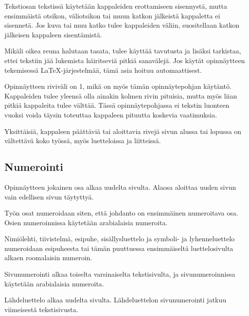 \documentclass[english,12pt,a4paper,pdftex,sci,utf8]{aaltothesis}
\begin{document}
Tekstiosan tekstiss\"a k\"aytet\"a\"an kappaleiden erottamiseen sisennyst\"a,
mutta ensimm\"aist\"a otsikon, v\"aliotsikon tai muun katkon j\"alkeist\"a
kappaletta ei sisennet\"a. Jos kuva tai muu katko tulee kappaleiden
v\"aliin, suositellaan katkon j\"alkeisen kappaleen sisent\"amist\"a.

Mik\"ali oikea reuna halutaan tasata, tulee k\"aytt\"a\"a tavutusta ja lis\"aksi
tarkistaa, ettei tekstiin j\"a\"a lukemista h\"airitsevi\"a pitki\"a sanav\"alej\"a. Jos
k\"ayt\"at opinn\"aytteen tekemisess\"a \LaTeX-j\"arjestelm\"a\"a,
t\"am\"a asia hoituu automaattisest.

Opinn\"aytteen riviv\"ali on 1, mik\"a on my\"os t\"am\"an opinn\"aytepohjan k\"ayt\"ant\"o.
Kappaleiden tulee yleens\"a olla ainakin kolmen rivin pituisia, mutta
my\"os liian pitki\"a kappaleita tulee v\"altt\"a\"a.  T\"ass\"a opinn\"aytepohjassa
ei tekstin luonteen vuoksi voida t\"aysin toteuttaa kappaleen pituutta koskevia
vaatimuksia.

Yksitt\"aisi\"a, kappaleen p\"a\"att\"avi\"a tai aloittavia rivej\"a sivun alussa
tai lopussa on v\"altett\"av\"a koko ty\"oss\"a, my\"os luetteloissa ja
liitteiss\"a.

\subsection*{Numerointi}

Opinn\"aytteen jokainen osa alkaa uudelta sivulta. Alaosa aloittaa uuden
sivun vain edellisen sivun t\"aytytty\"a.

Ty\"on osat numeroidaan siten, ett\"a johdanto on ensimm\"ainen numeroitava
osa. Osien numeroinnissa k\"aytet\"a\"an arabialaisia numeroita.

Nimi\"olehti, tiivistelm\"a, esipuhe, sis\"allysluettelo ja symboli- ja
lyhenneluettelo numeroidaan esipuheesta tai t\"am\"an puuttuessa
ensimm\"aiselt\"a luettelosivulta alkaen roomalaisin numeroin.

Sivunumerointi alkaa toiselta varsinaiselta tekstisivulta, ja
sivunumeroinnissa k\"aytet\"a\"an arabialaisia numeroita.

L\"ahdeluettelo alkaa uudelta sivulta. L\"ahdeluettelon sivunumerointi
jatkuu viimeisest\"a tekstisivusta.
\end{document}
